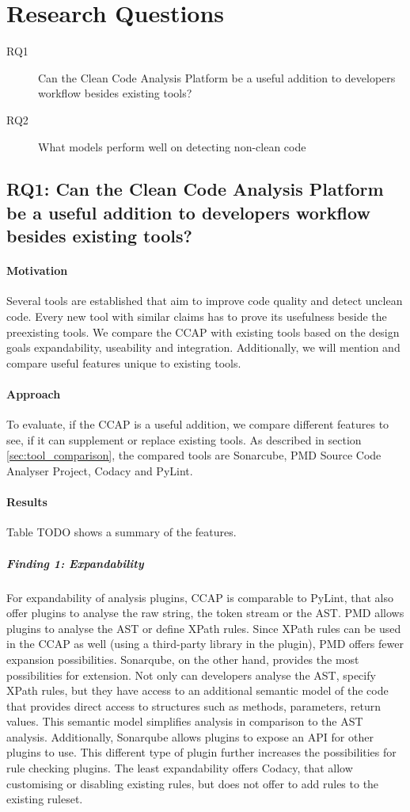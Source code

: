 \section{Research Questions}

\begin{description}
    \item[RQ1] Can the Clean Code Analysis Platform be a useful addition to developers workflow besides existing tools? 
    \item[RQ2] What models perform well on detecting non-clean code
\end{description}

\subsection{RQ1: Can the Clean Code Analysis Platform be a useful addition to developers workflow besides existing tools?}
\paragraph{Motivation}
Several tools are established that aim to improve code quality and detect unclean code. Every new tool with similar claims has to prove its usefulness beside the preexisting tools. We compare the CCAP with existing tools based on the design goals expandability, useability and integration. Additionally, we will mention and compare useful features unique to existing tools.
\paragraph{Approach}
To evaluate, if the CCAP is a useful addition, we compare different features to see, if it can supplement or replace existing tools. As described in section \ref{sec:tool_comparison}, the compared tools are Sonarcube, PMD Source Code Analyser Project, Codacy and PyLint.

\paragraph{Results}
Table TODO shows a summary of the features.

\subparagraph{Finding 1: Expandability}
For expandability of analysis plugins, CCAP is comparable to PyLint, that also offer plugins to analyse the raw string, the token stream or the AST. PMD allows plugins to analyse the AST or define XPath rules. Since XPath rules can be used in the CCAP as well (using a third-party library in the plugin), PMD offers fewer expansion possibilities. Sonarqube, on the other hand, provides the most possibilities for extension. Not only can developers analyse the AST, specify XPath rules, but they have access to an additional semantic model of the code that provides direct access to structures such as methods, parameters, return values. This semantic model simplifies analysis in comparison to the AST analysis.
Additionally, Sonarqube allows plugins to expose an API for other plugins to use. This different type of plugin further increases the possibilities for rule checking plugins. The least expandability offers Codacy, that allow customising or disabling existing rules, but does not offer to add rules to the existing ruleset.

